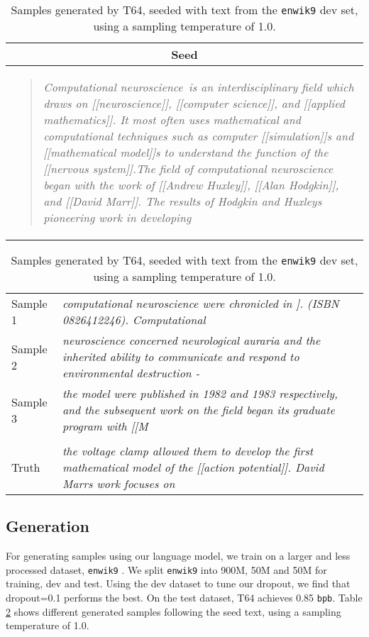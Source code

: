\documentclass[letterpaper]{article}
\newcommand{\enwiknine}{\texttt{enwik9}}
\newcommand{\bigmodel}{\textsc{T64}}
\newcommand{\corpus}[1]{\begin{quote}{\small \emph{#1}}\end{quote}}
\newcommand*\svtick{\textquotesingle}
\newcommand*\dvtick{\textquotesingle\textquotesingle}
\newcommand*\tvtick{\textquotesingle\textquotesingle\textquotesingle}
\begin{document}
\begin{table}[h!]
\begin{tabular}{p{}}
\multicolumn{1}{c}{\textbf{\small Seed}} \\\hline \vspace{-8.0pt}
\corpus{\tvtick{}Computational neuroscience\tvtick{}\ is an interdisciplinary field which draws on [[neuroscience]], [[computer science]], and [[applied mathematics]].  It most often uses mathematical and computational techniques such as computer [[simulation]]s and [[mathematical model]]s to understand the function of the [[nervous system]].\newline{}The field of computational neuroscience began with the work of [[Andrew Huxley]], [[Alan Hodgkin]], and [[David Marr]].  The results of Hodgkin and Huxley\svtick{}s pioneering work in developing } \\\hline
\end{tabular}
\begin{tabular}{l|p{}}
Sample 1 & {\small \emph{computational neuroscience were chronicled in \dvtick[[Is Mathematics Anything I Could Learn?]]\dvtick. (ISBN 0826412246).  Computational }} \\
Sample 2 & {\small \emph{neuroscience concerned neurological auraria and the inherited ability to communicate and respond to environmental destruction - }} \\
Sample 3 & {\small \emph{the model were published in 1982 and 1983 respectively, and the subsequent work on the field began its graduate program with [[M}} \\ \vspace{-6pt}
& \\
Truth & {\small \emph{the voltage clamp allowed them to develop the first mathematical model of the [[action potential]]. David Marr\svtick{}s work focuses on}}
\end{tabular}
\caption{Samples generated by \bigmodel{}, seeded with text from the \enwiknine{} dev set, using a sampling temperature of 1.0.}
\label{tab:gen}
\end{table}

\subsection{Generation}
For generating samples using our language model, we train on a larger and less processed dataset, \enwiknine{} \cite{mahoney}.
We split \enwiknine{} into 900M, 50M and 50M for training, dev and test.
Using the dev dataset to tune our dropout, we find that dropout=0.1 performs the best.
On the test dataset, \bigmodel{} achieves 0.85 \texttt{bpb}.
Table \ref{tab:gen} shows different generated samples following the seed text, using a sampling temperature of 1.0.
\end{document}
